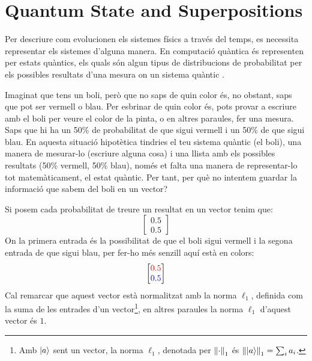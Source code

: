 \section{Quantum State and Superpositions}
Per descriure com evolucionen els sistemes físics a través del temps, es necessita representar els sistemes d'alguna manera. En computació quàntica és representen per estats quàntics, els quals són algun tipus de distribucions de probabilitat per els possibles resultats d'una mesura on un sistema quàntic \cite{QT_concepts:q_systems}.

Imaginat que tens un boli, però que no saps de quin color és, no obstant, saps que pot ser vermell o blau. Per esbrinar de quin color és, pots provar a escriure amb el boli per veure el color de la pinta, o en altres paraules, fer una mesura. Saps que hi ha un 50\% de probabilitat de que sigui vermell i un 50\% de que sigui blau. En aquesta situació hipotètica tindries el teu sistema quàntic (el boli), una manera de mesurar-lo (escriure alguna cosa) i una llista amb els possibles resultats (50\% vermell, 50\% blau), només et falta una manera de representar-lo tot matemàticament, el estat quàntic. Per tant, per què no intentem guardar la informació que sabem del boli en un vector?

Si posem cada probabilitat de treure un resultat en un vector tenim que:
$$
\begin{bmatrix}
	0.5 \\
	0.5
\end{bmatrix}
$$
On la primera entrada és la possibilitat de que el boli sigui vermell i la segona entrada de que sigui blau, per fer-ho més senzill aquí està en colors:
$$
\begin{bmatrix}
	\textcolor{red}{0.5} \\
	\textcolor{blue}{0.5}
\end{bmatrix}
$$
Cal remarcar que aquest vector està normalitzat amb la norma $\ell_1$, definida com la suma de les entrades d'un vector\footnote{Amb $\ket{a}$ sent un vector, la norma $\ell_1$, denotada per $\norm{\cdot}_1$ és $\norm{\ket{a}}_1 = \sum_i a_i$.}, en altres paraules la norma $\ell_1$ d'aquest vector és $1$.

